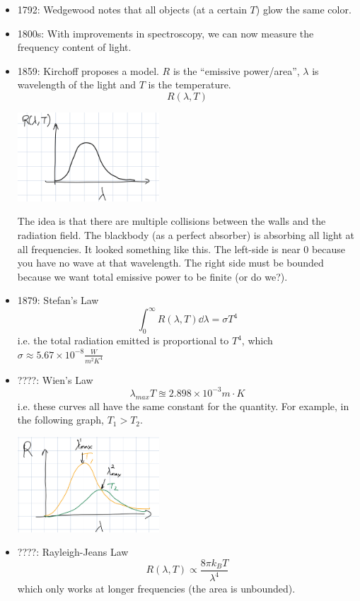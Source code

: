 \begin{itemize}
    \item 1792: Wedgewood notes that all objects (at a certain $T$) glow the same color.
    \item 1800s: With improvements in spectroscopy, we can now measure the frequency content of light.
    \item 1859: Kirchoff proposes a model. $R$ is the ``emissive power/area'', $\lambda$ is wavelength of the light and $T$ is the temperature.
    \[ R(\lambda, T) \]
    \begin{center}
    \includegraphics[width=200px]{../images/Kirchoff_model.jpeg}
    \end{center}
    The idea is that there are multiple collisions between the walls and the radiation field. The blackbody (as a perfect absorber) is absorbing all light at all frequencies.
    It looked something like this. The left-side is near 0 because you have no wave at that wavelength. The right side must be bounded because we want total emissive power to be finite (or do we?).
    \item 1879: Stefan's Law
    \[ \int_{0}^{\infty} R(\lambda, T) \dd{\lambda} = \sigma T^4 \]
    i.e. the total radiation emitted is proportional to $T^4$, which $\sigma \approx 5.67 \times 10^{-8} \frac{W}{m^2 K^4}$ 
    \item ????: Wien's Law
    \[ \lambda_{max} T \approxeq 2.898 \times 10^{-3} m \cdot K\]
    i.e. these curves all have the same constant for the quantity. For example, in the following graph, $T_1 > T_2$.
    \begin{center}
        \includegraphics[width=200px]{../images/Wiens_law.jpeg}
    \end{center}
    \item ????: Rayleigh-Jeans Law
    \[ R(\lambda, T) \propto \frac{8 \pi k_B T}{\lambda^4} \]
    which only works at longer frequencies (the area is unbounded).
\end{itemize}

